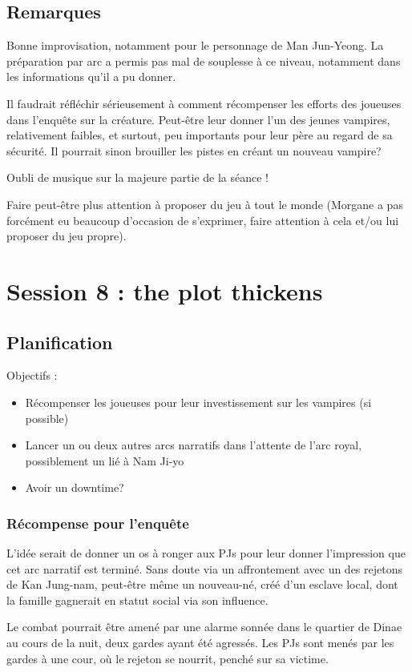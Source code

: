 \documentclass[10pt,a4paper]{book}
\begin{document}
\subsection{Remarques}
Bonne improvisation, notamment pour le personnage de Man Jun-Yeong. La préparation par arc a permis pas mal de souplesse à ce niveau, notamment dans les informations qu'il a pu donner.

Il faudrait réfléchir sérieusement à comment récompenser les efforts des joueuses dans l'enquête sur la créature. Peut-être leur donner l'un des jeunes vampires, relativement faibles, et surtout, peu importants pour leur père au regard de sa sécurité. Il pourrait sinon brouiller les pistes en créant un nouveau vampire?

Oubli de musique sur la majeure partie de la séance !

Faire peut-être plus attention à proposer du jeu à tout le monde (Morgane a pas forcément eu beaucoup d'occasion de s'exprimer, faire attention à cela et/ou lui proposer du jeu propre).
\section{Session 8 : the plot thickens}
\subsection{Planification}
Objectifs :
\begin{itemize}
\item Récompenser les joueuses pour leur investissement sur les vampires (si possible)
\item Lancer un ou deux autres arcs narratifs dans l'attente de l'arc royal, possiblement un lié à Nam Ji-yo
\item Avoir un downtime?
\end{itemize}

\subsubsection{Récompense pour l'enquête}
L'idée serait de donner un os à ronger aux PJs pour leur donner l'impression que cet arc narratif est terminé. Sans doute via un affrontement avec un des rejetons de Kan Jung-nam, peut-être même un nouveau-né, créé d'un esclave local, dont la famille gagnerait en statut social via son influence. 

Le combat pourrait être amené par une alarme sonnée dans le quartier de Dinae au cours de la nuit, deux gardes ayant été agressés. Les PJs sont menés par les gardes à une cour, où le rejeton se nourrit, penché sur sa victime.
\end{document}
